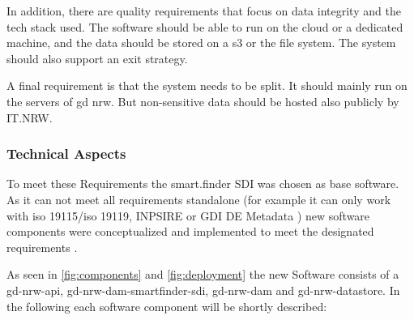 \documentclass[11pt, titlepage, a4paper]{article}
\begin{document}
In addition, there are quality requirements that focus on data integrity and the tech stack used. The software should be able to run on the cloud or a dedicated machine, and the data should be stored on a \gls{s3} or the file system. The system should also support an exit strategy.

A final requirement is that the system needs to be split. It should mainly run on the servers of  \gls{gd} \gls {nrw}. But  non-sensitive data should be hosted also publicly by IT.NRW.

\subsubsection{Technical Aspects}
To meet these Requirements the smart.finder SDI was chosen as base software. As it can not meet all requirements standalone (for example it can only work with \gls{iso} 19115/\gls{iso} 19119, INPSIRE \cite{temporarymiwp2021-2024sub-group2.3.1TechnicalGuidanceImplementation} or GDI DE Metadata \cite{gdi-dearbeitskreismetadatenArchitekturGeodateninfrastrukturDeutschlandKonventionen}) new software components were conceptualized and implemented to meet the designated requirements \cite{conterraSmartFinderSDI}.



As seen in \ref{fig:components} and \ref{fig:deployment} the new Software consists of a gd-nrw-api, gd-nrw-dam-smartfinder-sdi, gd-nrw-dam and gd-nrw-datastore.
In the following each software component will be shortly described:
\end{document}
